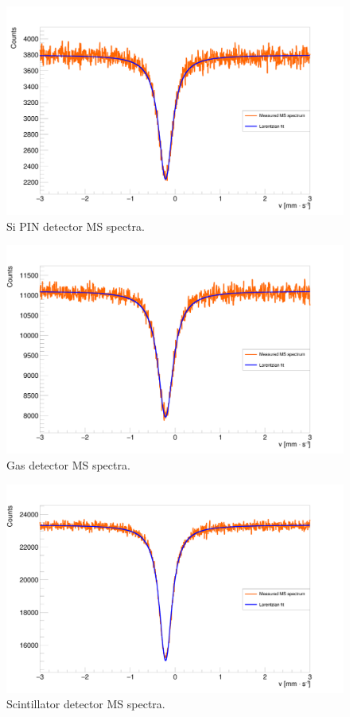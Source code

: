 \begin{figure}[H]
\centering
\includegraphics[scale=0.125, angle = 0]{./pictures/MossSemi.png}
\caption{Si PIN detector MS spectra.}
\label{Si PIN detector MS spectra.}

\end{figure}

\begin{figure}[H]
\centering
\includegraphics[scale=0.125, angle = 0]{./pictures/MossGas.png}
\caption{Gas detector MS spectra.}
\label{Gas detector MS spectra.}

\end{figure}

\begin{figure}[H]
\centering
\includegraphics[scale=0.125, angle = 0]{./pictures/MossPMT.png}
\caption{Scintillator detector MS spectra.}
\label{Scintillator detector MS spectra.}

\end{figure}


